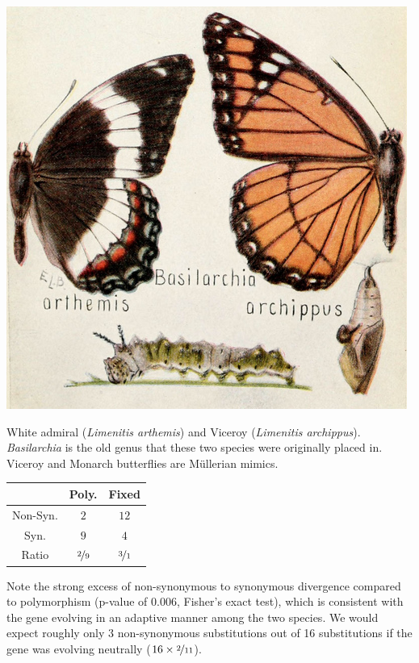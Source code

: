 \begin{marginfigure}
\begin{center}
\includegraphics[width=\textwidth]{illustration_images/Genetic_drift/Basilarchia_arthemis_archippus/Basilarchia_arthemis_archippus.png}
\end{center}
\caption{White admiral ({\it Limenitis arthemis}) and Viceroy ({\it Limenitis archippus}).  {\it Basilarchia} is the old genus that these two species were originally placed in. Viceroy and Monarch butterflies are M\"ullerian mimics. } \label{fig:Limenitis}
\end{marginfigure}
\begin{center}
\begin{tabular}{ccc}
 & Poly. & Fixed  \\
 \hline
Non-Syn. &    $2$  &   $12$ \\
Syn. &    $9$   &     $4$  \\
Ratio & $\nicefrac{2}{9}$  & $\nicefrac{3}{1}$
\end{tabular}
\end{center}
Note the strong excess of non-synonymous to synonymous divergence
compared to polymorphism (p-value of $0.006$, Fisher's exact test),
which is consistent with the gene evolving in an adaptive manner among
the two species. We would expect roughly only $3$ non-synonymous
substitutions out of 16 substitutions if the gene was evolving
neutrally ($ 16 \times \nicefrac{2}{11}$). 


